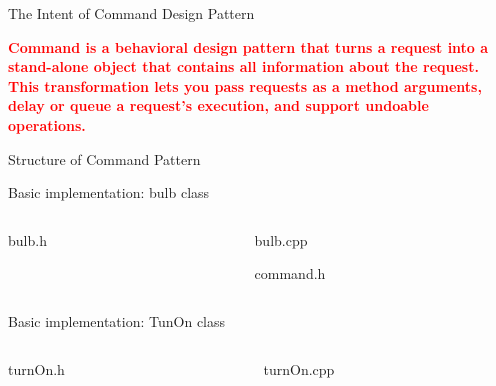 \documentclass[13pt]{beamer}
\begin{document}
\begin{frame}{The Intent of Command Design Pattern}
	\begin{center}
	\textcolor{red}{\textbf{Command is a behavioral design pattern that turns a request into a stand-alone object that contains all information about the request. This transformation lets you pass requests as a method arguments, delay or queue a request’s execution, and support undoable operations.}}\\
	\end{center}
\end{frame}

\begin{frame}{Structure of Command Pattern}
	\begin{center}
	\end{center}
\end{frame}

\begin{frame}{Basic implementation: bulb class}
\begin{columns}[T]
\begin{column}{.45\textwidth}
\lstset{basicstyle=\tiny,style=myCustomCppStyle}
bulb.h

\end{column}

\begin{column}{.45\textwidth}
\lstset{basicstyle=\tiny,style=myCustomCppStyle}
bulb.cpp


command.h

\end{column}
\end{columns}
\end{frame}

\begin{frame}{Basic implementation: TunOn class}
\begin{columns}[T]
\begin{column}{.45\textwidth}
\lstset{basicstyle=\tiny,style=myCustomCppStyle}
turnOn.h

\end{column}

\begin{column}{.45\textwidth}
\lstset{basicstyle=\tiny,style=myCustomCppStyle}
turnOn.cpp

\end{column}
\end{columns}
\end{frame}
\end{document}
